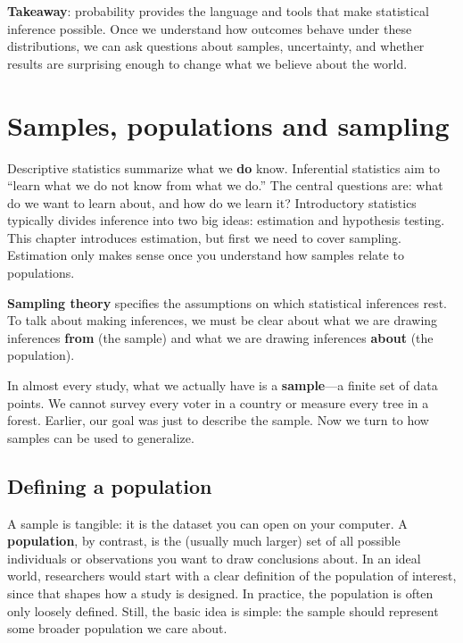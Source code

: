 \documentclass[
  letterpaper,
  DIV=11,
  numbers=noendperiod]{scrreprt}
\begin{document}
\textbf{Takeaway}: probability provides the language and tools that make
statistical inference possible. Once we understand how outcomes behave
under these distributions, we can ask questions about samples,
uncertainty, and whether results are surprising enough to change what we
believe about the world.

\section{Samples, populations and
sampling}\label{samples-populations-and-sampling}

Descriptive statistics summarize what we \textbf{do} know. Inferential
statistics aim to ``learn what we do not know from what we do.'' The
central questions are: what do we want to learn about, and how do we
learn it? Introductory statistics typically divides inference into two
big ideas: estimation and hypothesis testing. This chapter introduces
estimation, but first we need to cover sampling. Estimation only makes
sense once you understand how samples relate to populations.

\textbf{Sampling theory} specifies the assumptions on which statistical
inferences rest. To talk about making inferences, we must be clear about
what we are drawing inferences \textbf{from} (the sample) and what we
are drawing inferences \textbf{about} (the population).

In almost every study, what we actually have is a \textbf{sample}---a
finite set of data points. We cannot survey every voter in a country or
measure every tree in a forest. Earlier, our goal was just to describe
the sample. Now we turn to how samples can be used to generalize.

\subsection{Defining a population}\label{defining-a-population}

A sample is tangible: it is the dataset you can open on your computer. A
\textbf{population}, by contrast, is the (usually much larger) set of
all possible individuals or observations you want to draw conclusions
about. In an ideal world, researchers would start with a clear
definition of the population of interest, since that shapes how a study
is designed. In practice, the population is often only loosely defined.
Still, the basic idea is simple: the sample should represent some
broader population we care about.
\end{document}
